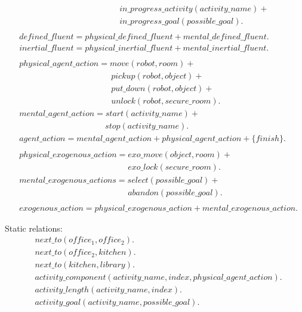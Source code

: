 \documentclass[11pt, oneside]{article}
\begin{document}
\begin{allowdisplaybreaks}
\begin{align*}
&\qquad\qquad\qquad\qquad\qquad\qquad in\_progress\_activity(activity\_name)+\\
&\qquad\qquad\qquad\qquad\qquad\qquad in\_progress\_goal(possible\_goal).\\
\\
&defined\_fluent = physical\_defined\_fluent + mental\_defined\_fluent.\\
&inertial\_fluent = physical\_inertial\_fluent + mental\_inertial\_fluent.\\
\\
&physical\_agent\_action =   move(robot, room) +\\
  &\qquad\qquad\qquad\qquad\qquad\quad pickup(robot,object) +\\
  &\qquad\qquad\qquad\qquad\qquad\quad put\_down(robot,object) +\\
  &\qquad\qquad\qquad\qquad\qquad\quad unlock(robot,secure\_room).\\
&mental\_agent\_action =   start(activity\_name) +\\
  &\qquad\qquad\qquad\qquad\qquad\; stop(activity\_name).\\
  &agent\_action = mental\_agent\_action + physical\_agent\_action + \{finish\}.\\
\\
&physical\_exogenous\_action = exo\_move(object, room) + \\
  &\qquad\qquad\qquad\qquad\qquad\qquad\quad exo\_lock(secure\_room).\\
  &mental\_exogenous\_actions = select(possible\_goal) + \\
&\qquad\qquad\qquad\qquad\qquad\qquad\quad  abandon(possible\_goal).\\
\\
&exogenous\_action = physical\_exogenous\_action + mental\_exogenous\_action.
\end{align*}
\end{allowdisplaybreaks}



Static relations:
\begin{align*}
  &next\_to(office_1, office_2).\\
  &next\_to(office_2, kitchen).\\
  &next\_to(kitchen, library).\\
  &activity\_component(activity\_name, index, physical\_agent\_action).\\
  &activity\_length(activity\_name, index).\\
  &activity\_goal(activity\_name, possible\_goal).
\end{align*}
\end{document}
